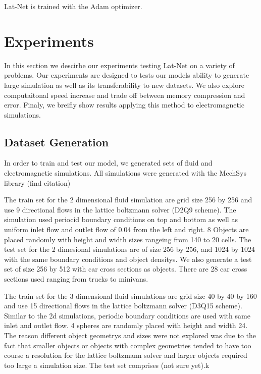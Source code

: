 \documentclass{article}
\begin{document}

Lat-Net is trained with the Adam optimizer\cite{kingma2014adam}.

\section{Experiments}

In this section we descirbe our experiments testing Lat-Net on a variety of problems. Our experiments are designed to tests our models ability to generate large simulation as well as its transferability to new datasets. We also explore computaitonal speed increase and trade off between memory compression and error. Finaly, we breifly show results applying this method to electromagnetic simulations.

\subsection{Dataset Generation}
In order to train and test our model, we generated sets of fluid and electromagnetic simulations. All simulations were generated with the MechSys library (find citation)

The train set for the 2 dimensional fluid simulation are grid size 256 by 256 and use 9 directional flows in the lattice boltzmann solver (D2Q9 scheme)\cite{guo2013lattice}. The simulation used periocid boundary conditions on top and bottom as well as uniform inlet flow and outlet flow of 0.04 from the left and right. 8 Objects are placed randomly with height and width sizes rangeing from 140 to 20 cells. The test set for the 2 dimesional simulations are of size 256 by 256, and 1024 by 1024 with the same boundary conditions and object densitys. We also generate a test set of size 256 by 512 with car cross sections as objects. There are 28 car cross sections used ranging from trucks to minivans.

The train set for the 3 dimensional fluid simulations are grid size 40 by 40 by 160 and use 15 directional flows in the lattice boltzmann solver (D3Q15 scheme)\cite{guo2013lattice}. Similar to the 2d simulations, periodic boundary conditions are used with same inlet and outlet flow. 4 spheres are randomly placed with height and width 24. The reason different object geometrys and sizes were not explored was due to the fact that smaller objects or objects with complex geometries tended to have too course a resolution for the lattice boltzmann solver and larger objects required too large a simulation size. The test set comprises (not sure yet).k
\end{document}
